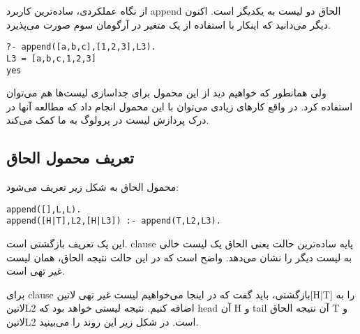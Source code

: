 از نگاه عملکردی، ساده‌ترین کاربرد append الحاق دو لیست به یکدیگر است. اکنون دیگر می‌دانید که اینکار با استفاده از یک متغیر در آرگومان سوم صورت می‌پذیرد.
\begin{latin}
\begin{lstlisting}
?- append([a,b,c],[1,2,3],L3).
L3 = [a,b,c,1,2,3]
yes
\end{lstlisting}
\end{latin}
ولی همانطور که خواهیم دید از این محمول برای جداسازی لیست‌ها هم می‌توان استفاده کرد. در واقع کارهای زیادی می‌توان با این محمول انجام داد که مطالعه آنها در درک پردازش لیست در پرولوگ به ما کمک می‌کند.

\subsection{تعریف محمول الحاق}
محمول الحاق به شکل زیر تعریف می‌شود:
\begin{latin}
\begin{lstlisting}
append([],L,L).
append([H|T],L2,[H|L3]) :- append(T,L2,L3).
\end{lstlisting}
\end{latin}
این یک تعریف بازگشتی است. clause پایه ساده‌ترین حالت یعنی الحاق یک لیست خالی به لیست دیگر را نشان می‌دهد. واضح است که در این حالت نتیجه الحاق، همان لیست غیر تهی است.

برای clause بازگشتی، باید گفت که در اینجا می‌خواهیم لیست غیر تهی ‌لاتین{[H|T]} را به ‌لاتین{L2} اضافه کنیم. نتیجه لیستی خواهد بود که head آن H و tail آن نتیجه الحاق T و ‌لاتین{L2} است. در شکل زیر این روند را می‌بینید.

\begin{latin}
\end{latin}

